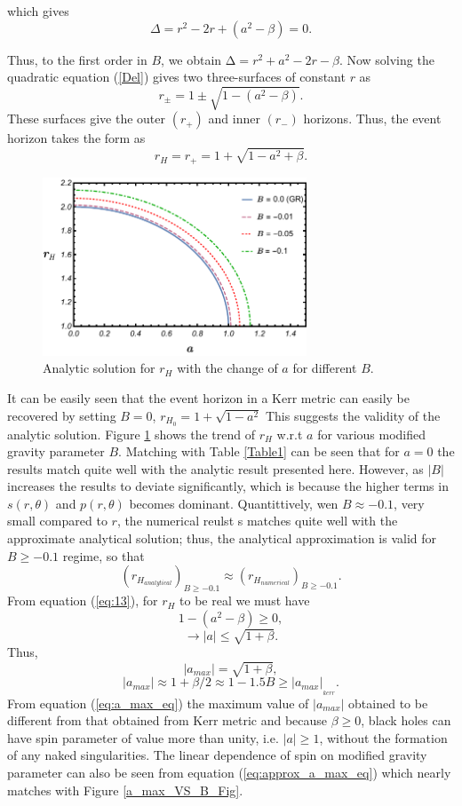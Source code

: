 \documentclass[12pt,a4paper,oneside]{book}
\newcommand{\eq}[2]{\begin{equation} \label{eq:#1} #2 \end{equation}}
\newcommand{\Eref}[1]{(\ref{eq:#1})}
\begin{document}
\noindent which gives
\begin{equation}
\Delta=r^2-2r+\left(a^2-\beta\right)=0.
\label{Del}
\end{equation}

\noindent Thus, to the first order in $B$, we obtain $\mathrm{\Delta }=r^2+a^2-2r-\beta$. Now solving the quadratic equation (\ref{Del}) gives two three-surfaces of constant $r$ as
\[r_{\pm }=1\pm \sqrt{1-\left(a^2-\beta \right)}.\] 
These surfaces give the outer $(r_+)$ and inner $\left(r_-\right)$ horizons. Thus, the event horizon takes the form as
\eq{13}{r_H=r_+=1+\sqrt{1-a^2+\beta}.}
\begin{figure}[t]
\centering
    \includegraphics[width=0.7\textwidth]{Analytic_r_H_Vs_a_fixed_B.pdf}
    \caption{\centering Analytic solution for $r_H$ with the change of $a$ for different $B$.}
    \label{fig:1}
\end{figure}


It can be easily seen that the event horizon in a Kerr metric can easily be recovered by setting $B=0$, $r_{H_0} = 1+\sqrt{1-a^2}$ This suggests the validity of the analytic solution. Figure \ref{fig:1} shows the trend of $r_H$ w.r.t $a$ for various modified gravity parameter $B$. Matching with Table \ref{Table1} can be seen that for $a=0$ the results match quite well with the analytic result presented here. However, as $|B|$ increases the results to deviate significantly, which is because the higher terms in $s(r,\theta)$ and $p(r,\theta)$ becomes dominant. Quantittively, wen $B\approx-0.1$, very small compared to $r$, the numerical reulst s matches quite well with the approximate analytical solution; thus, the analytical approximation is valid for $B\ge-0.1$ regime, so that 
\[{\left(r_{H_{analytical}}\right)}_{B\ge -0.1}\approx {\left(r_{H_{numerical}}\right)}_{B\ge -0.1}.\] 
From equation \Eref{13}, for $r_H$ to be real we must have
\[1-\left(a^2-\beta \right)\ge 0,\] 
\[\to \left|a\right|\le \sqrt{1+\beta }.\]
Thus,
\eq{a_max_eq}{|a_{max}| = \sqrt{1+\beta },}
\eq{approx_a_max_eq}{|a_{max}|\approx 1 + \beta/2 \approx1-1.5B\geq|a_{max}|_{_{kerr}}.}
From equation \Eref{a_max_eq} the maximum value of $|a_{max}|$ obtained to be different from that obtained from Kerr metric and because $\beta \geq 0$, black holes can have spin parameter of value more than unity, i.e. $\left|a\right|\ge 1$, without the formation of any naked singularities. The linear dependence of spin on modified gravity parameter can also be seen from equation \Eref{approx_a_max_eq} which nearly matches with Figure \ref{a_max_VS_B_Fig}.
\end{document}
